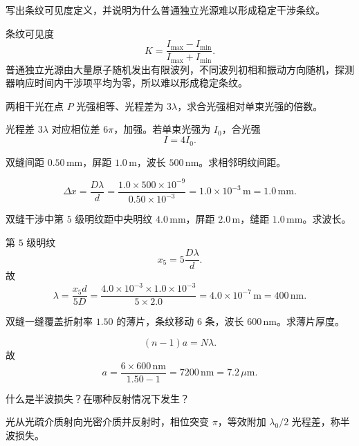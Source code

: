\begin{exercise}[level=basic]
写出条纹可见度定义，并说明为什么普通独立光源难以形成稳定干涉条纹。
\begin{solution}
条纹可见度
\[
  K=\frac{I_{\max}-I_{\min}}{I_{\max}+I_{\min}}.
\]
普通独立光源由大量原子随机发出有限波列，不同波列初相和振动方向随机，探测器响应时间内干涉项平均为零，所以难以形成稳定条纹。
\end{solution}
\end{exercise}

\begin{exercise}[level=standard]
两相干光在点 $P$ 光强相等、光程差为 $3\lambda$，求合光强相对单束光强的倍数。
\begin{solution}
光程差 $3\lambda$ 对应相位差 $6\pi$，加强。若单束光强为 $I_0$，合光强
\[
  I=4I_0.
\]
\end{solution}
\end{exercise}

\begin{exercise}[level=standard]
双缝间距 $0.50\,\mathrm{mm}$，屏距 $1.0\,\mathrm{m}$，波长 $500\,\mathrm{nm}$。求相邻明纹间距。
\begin{solution}
\[
  \Delta x=\frac{D\lambda}{d}
  =\frac{1.0\times500\times10^{-9}}{0.50\times10^{-3}}
  =1.0\times10^{-3}\,\mathrm{m}=1.0\,\mathrm{mm}.
\]
\end{solution}
\end{exercise}

\begin{exercise}[level=standard]
双缝干涉中第 $5$ 级明纹距中央明纹 $4.0\,\mathrm{mm}$，屏距 $2.0\,\mathrm{m}$，缝距 $1.0\,\mathrm{mm}$。求波长。
\begin{solution}
第 $5$ 级明纹
\[
  x_5=5\frac{D\lambda}{d}.
\]
故
\[
  \lambda=\frac{x_5d}{5D}
  =\frac{4.0\times10^{-3}\times1.0\times10^{-3}}{5\times2.0}
  =4.0\times10^{-7}\,\mathrm{m}=400\,\mathrm{nm}.
\]
\end{solution}
\end{exercise}

\begin{exercise}[level=standard]
双缝一缝覆盖折射率 $1.50$ 的薄片，条纹移动 $6$ 条，波长 $600\,\mathrm{nm}$。求薄片厚度。
\begin{solution}
\[
  (n-1)a=N\lambda.
\]
故
\[
  a=\frac{6\times600\,\mathrm{nm}}{1.50-1}
  =7200\,\mathrm{nm}=7.2\,\mu\mathrm{m}.
\]
\end{solution}
\end{exercise}

\begin{exercise}[level=basic]
什么是半波损失？在哪种反射情况下发生？
\begin{solution}
光从光疏介质射向光密介质并反射时，相位突变 $\pi$，等效附加 $\lambda_0/2$ 光程差，称半波损失。
\end{solution}
\end{exercise}

